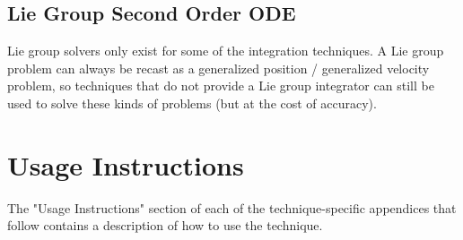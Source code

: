 \subsection{Lie Group Second Order ODE}

Lie group solvers only exist for some of the integration techniques.
A Lie group problem can always be recast as a generalized position /
generalized velocity problem, so techniques that do not provide a Lie
group integrator can still be used to solve these kinds of problems
(but at the cost of accuracy).

\section{Usage Instructions}

The "Usage Instructions" section of each of the technique-specific
appendices that follow contains a description of how to use the technique.
